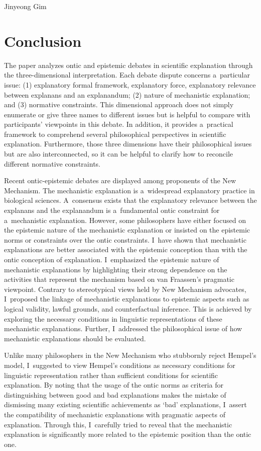 \begin{artengenv}{Jinyeong Gim}
\section*{Conclusion}
The paper analyzes ontic and epistemic debates in scientific explanation through the three-dimensional interpretation. Each debate dispute concerns a~particular issue: (1) explanatory formal framework, explanatory force, explanatory relevance between explanans and an explanandum; (2) nature of mechanistic explanation; and (3) normative constraints. This dimensional approach does not simply enumerate or give three names to different issues but is helpful to compare with participants' viewpoints in this debate. In addition, it provides a~practical framework to comprehend several philosophical perspectives in scientific explanation. Furthermore, those three dimensions have their philosophical issues but are also interconnected, so it can be helpful to clarify how to reconcile different normative constraints.

Recent ontic-epistemic debates are displayed among proponents of the New Mechanism. The mechanistic explanation is a~widespread explanatory practice in biological sciences. A~consensus exists that the explanatory relevance between the explanans and the explanandum is a~fundamental ontic constraint for a~mechanistic explanation. However, some philosophers have either focused on the epistemic nature of the mechanistic explanation or insisted on the epistemic norms or constraints over the ontic constraints. I~have shown that mechanistic explanations are better associated with the epistemic conception than with the ontic conception of explanation. I~emphasized the epistemic nature of mechanistic explanations by highlighting their strong dependence on the activities that represent the mechanism based on van Fraassen's pragmatic viewpoint. Contrary to stereotypical views held by New Mechanism advocates, I~proposed the linkage of mechanistic explanations to epistemic aspects such as logical validity, lawful grounds, and counterfactual inference. This is achieved by exploring the necessary conditions in linguistic representations of these mechanistic explanations. Further, I~addressed the philosophical issue of how mechanistic explanations should be evaluated.

Unlike many philosophers in the New Mechanism who stubbornly reject Hempel's model, I~suggested to view Hempel's conditions as necessary conditions for linguistic representation rather than sufficient conditions for scientific explanation. By noting that the usage of the ontic norms as criteria for distinguishing between good and bad explanations makes the mistake of dismissing many existing scientific achievements as ‘bad' explanations, I~assert the compatibility of mechanistic explanations with pragmatic aspects of explanation. Through this, I~carefully tried to reveal that the mechanistic explanation is significantly more related to the epistemic position than the ontic one.

\end{artengenv}
